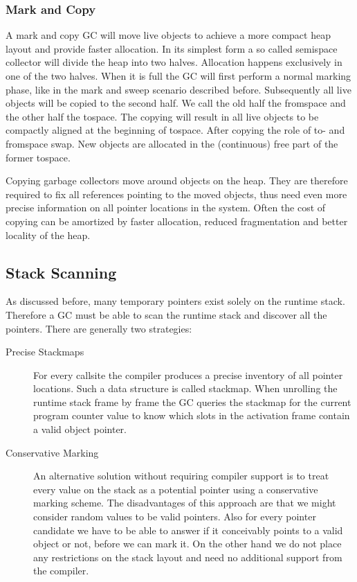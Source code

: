 \subsubsection{Mark and Copy}

A mark and copy GC will move live objects to achieve a more compact heap layout and provide faster allocation. In its simplest form a so called semispace collector will divide the heap into two halves. Allocation happens exclusively in one of the two halves. When it is full the GC will first perform a normal marking phase, like in the mark and sweep scenario described before. Subsequently all live objects will be copied to the second half. We call the old half the fromspace and the other half the tospace. The copying will result in all live objects to be compactly aligned at the beginning of tospace. After copying the role of to- and fromspace swap. New objects are allocated in the (continuous) free part of the former tospace.

Copying garbage collectors move around objects on the heap. They are therefore required to fix all references pointing to the moved objects, thus need even more precise information on all pointer locations in the system. Often the cost of copying can be amortized by faster allocation, reduced fragmentation and better locality of the heap.

\subsection{Stack Scanning}

As discussed before, many temporary pointers exist solely on the runtime stack. Therefore a GC must be able to scan the runtime stack and discover all the pointers. There are generally two strategies:

\begin{description}
  \item[Precise Stackmaps] For every callsite the compiler produces a precise inventory of all pointer locations. Such a data structure is called stackmap. When unrolling the runtime stack frame by frame the GC queries the stackmap for the current program counter value to know which slots in the activation frame contain a valid object pointer.
  \item[Conservative Marking] An alternative solution without requiring compiler support is to treat every value on the stack as a potential pointer using a conservative marking scheme. The disadvantages of this approach are that we might consider random values to be valid pointers. Also for every pointer candidate we have to be able to answer if it conceivably points to a valid object or not, before we can mark it. On the other hand we do not place any restrictions on the stack layout and need no additional support from the compiler.  
\end{description}

